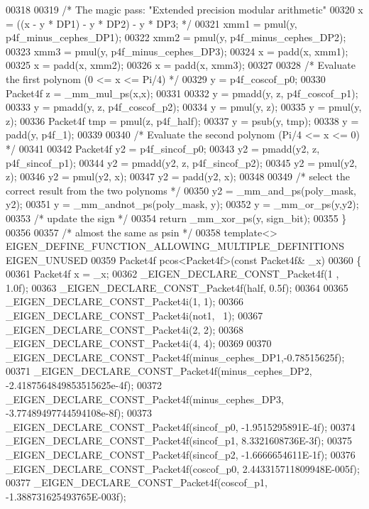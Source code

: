 \begin{DoxyCode}
00318 
00319   \textcolor{comment}{/* The magic pass: "Extended precision modular arithmetic"}
00320 \textcolor{comment}{     x = ((x - y * DP1) - y * DP2) - y * DP3; */}
00321   xmm1 = pmul(y, p4f\_minus\_cephes\_DP1);
00322   xmm2 = pmul(y, p4f\_minus\_cephes\_DP2);
00323   xmm3 = pmul(y, p4f\_minus\_cephes\_DP3);
00324   x = padd(x, xmm1);
00325   x = padd(x, xmm2);
00326   x = padd(x, xmm3);
00327 
00328   \textcolor{comment}{/* Evaluate the first polynom  (0 <= x <= Pi/4) */}
00329   y = p4f\_coscof\_p0;
00330   Packet4f z = \_mm\_mul\_ps(x,x);
00331 
00332   y = pmadd(y, z, p4f\_coscof\_p1);
00333   y = pmadd(y, z, p4f\_coscof\_p2);
00334   y = pmul(y, z);
00335   y = pmul(y, z);
00336   Packet4f tmp = pmul(z, p4f\_half);
00337   y = psub(y, tmp);
00338   y = padd(y, p4f\_1);
00339 
00340   \textcolor{comment}{/* Evaluate the second polynom  (Pi/4 <= x <= 0) */}
00341 
00342   Packet4f y2 = p4f\_sincof\_p0;
00343   y2 = pmadd(y2, z, p4f\_sincof\_p1);
00344   y2 = pmadd(y2, z, p4f\_sincof\_p2);
00345   y2 = pmul(y2, z);
00346   y2 = pmul(y2, x);
00347   y2 = padd(y2, x);
00348 
00349   \textcolor{comment}{/* select the correct result from the two polynoms */}
00350   y2 = \_mm\_and\_ps(poly\_mask, y2);
00351   y = \_mm\_andnot\_ps(poly\_mask, y);
00352   y = \_mm\_or\_ps(y,y2);
00353   \textcolor{comment}{/* update the sign */}
00354   \textcolor{keywordflow}{return} \_mm\_xor\_ps(y, sign\_bit);
00355 \}
00356 
00357 \textcolor{comment}{/* almost the same as psin */}
00358 \textcolor{keyword}{template}<> EIGEN\_DEFINE\_FUNCTION\_ALLOWING\_MULTIPLE\_DEFINITIONS EIGEN\_UNUSED
00359 Packet4f pcos<Packet4f>(\textcolor{keyword}{const} Packet4f& \_x)
00360 \{
00361   Packet4f x = \_x;
00362   \_EIGEN\_DECLARE\_CONST\_Packet4f(1 , 1.0f);
00363   \_EIGEN\_DECLARE\_CONST\_Packet4f(half, 0.5f);
00364 
00365   \_EIGEN\_DECLARE\_CONST\_Packet4i(1, 1);
00366   \_EIGEN\_DECLARE\_CONST\_Packet4i(not1, ~1);
00367   \_EIGEN\_DECLARE\_CONST\_Packet4i(2, 2);
00368   \_EIGEN\_DECLARE\_CONST\_Packet4i(4, 4);
00369 
00370   \_EIGEN\_DECLARE\_CONST\_Packet4f(minus\_cephes\_DP1,-0.78515625f);
00371   \_EIGEN\_DECLARE\_CONST\_Packet4f(minus\_cephes\_DP2, -2.4187564849853515625e-4f);
00372   \_EIGEN\_DECLARE\_CONST\_Packet4f(minus\_cephes\_DP3, -3.77489497744594108e-8f);
00373   \_EIGEN\_DECLARE\_CONST\_Packet4f(sincof\_p0, -1.9515295891E-4f);
00374   \_EIGEN\_DECLARE\_CONST\_Packet4f(sincof\_p1,  8.3321608736E-3f);
00375   \_EIGEN\_DECLARE\_CONST\_Packet4f(sincof\_p2, -1.6666654611E-1f);
00376   \_EIGEN\_DECLARE\_CONST\_Packet4f(coscof\_p0,  2.443315711809948E-005f);
00377   \_EIGEN\_DECLARE\_CONST\_Packet4f(coscof\_p1, -1.388731625493765E-003f);

\end{DoxyCode}
